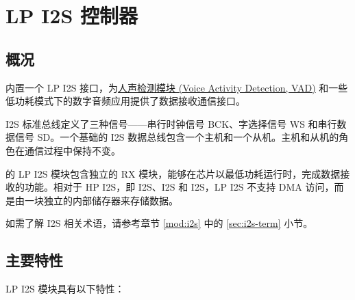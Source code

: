 \documentclass[main\_\_CN.tex]{subfiles}
\begin{document}

\ifglobal
\else
    {\let\clearpage\relax \listoftodos}
    {\let\clearpage\relax \listofdonetodos}
    \tableofcontents
\fi



\hypertarget{lpi2s}{}
\chapter{LP I2S 控制器}
\label{mod:lpi2s}


\section{概况}

\chipname{} 内置一个 LP I2S 接口，为\hyperref[mod:vad]{人声检测模块 (Voice Activity Detection, VAD)} 和一些低功耗模式下的数字音频应用提供了数据接收通信接口。

I2S 标准总线定义了三种信号——串行时钟信号 BCK、字选择信号 WS 和串行数据信号 SD。一个基础的 I2S 数据总线包含一个主机和一个从机。主机和从机的角色在通信过程中保持不变。

\chipname{} 的 LP I2S 模块包含独立的 RX 模块，能够在芯片以最低功耗运行时，完成数据接收的功能。相对于 HP I2S，即 I2S、I2S 和 I2S，LP I2S 不支持 DMA 访问，而是由一块独立的内部储存器来存储数据。

\begin{tiplisting}
如需了解 I2S 相关术语，请参考章节 \ref{mod:i2s} \textit{} 中的 \ref{sec:i2s-term} \textit{}  小节。
\end{tiplisting}
\vspace{-1em}



\section{主要特性}
\label{sec:lpi2s-features}

LP I2S 模块具有以下特性：
\end{document}
